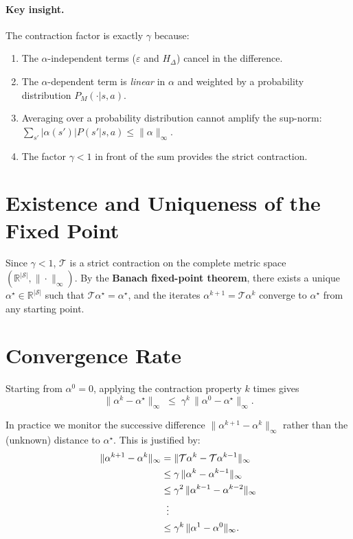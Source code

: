 \documentclass[11pt]{article}
\begin{document}
\paragraph{Key insight.} The contraction factor is exactly $\gamma$ because:
\begin{enumerate}
  \item The $\alpha$-independent terms ($\varepsilon$ and $H_\Delta$) cancel in the difference.
  \item The $\alpha$-dependent term is \emph{linear} in $\alpha$ and weighted by a probability distribution $P_M(\cdot|s,a)$.
  \item Averaging over a probability distribution cannot amplify the sup-norm: $\sum_{s'} |\alpha(s')| P(s'|s,a) \le \|\alpha\|_\infty$.
  \item The factor $\gamma < 1$ in front of the sum provides the strict contraction.
\end{enumerate}

\section{Existence and Uniqueness of the Fixed Point}

Since $\gamma < 1$, $\mathcal{T}$ is a strict contraction on the complete metric
space $(\mathbb{R}^{|\mathcal{S}|}, \|\cdot\|_\infty)$.  By the
\textbf{Banach fixed-point theorem}, there exists a unique
$\alpha^\star \in \mathbb{R}^{|\mathcal{S}|}$ such that
$\mathcal{T}\alpha^\star = \alpha^\star$, and the iterates
$\alpha^{k+1} = \mathcal{T}\alpha^k$ converge to $\alpha^\star$ from any
starting point.

\section{Convergence Rate}

Starting from $\alpha^0 = 0$, applying the contraction property $k$ times gives
\begin{equation}\label{eq:error-to-fixed}
  \|\alpha^k - \alpha^\star\|_\infty
  \;\le\; \gamma^k\, \|\alpha^0 - \alpha^\star\|_\infty.
\end{equation}

In practice we monitor the successive difference
$\|\alpha^{k+1} - \alpha^k\|_\infty$ rather than the (unknown) distance to
$\alpha^\star$.  This is justified by:
\begin{align}
  \|\alpha^{k+1} - \alpha^k\|_\infty
  &= \|\mathcal{T}\alpha^k - \mathcal{T}\alpha^{k-1}\|_\infty \notag \\
  &\le \gamma\, \|\alpha^k - \alpha^{k-1}\|_\infty \notag \\
  &\le \gamma^2\, \|\alpha^{k-1} - \alpha^{k-2}\|_\infty \notag \\
  &\;\;\vdots \notag \\
  &\le \gamma^k\, \|\alpha^1 - \alpha^0\|_\infty.
  \label{eq:successive}
\end{align}
\end{document}

